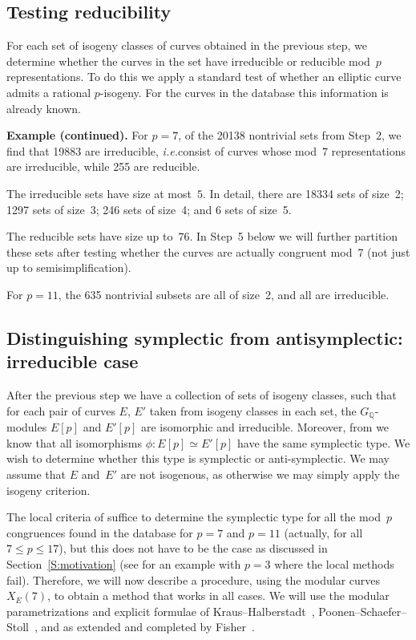 \documentclass[12pt]{amsart}
\newcommand{\Q}{\mathbb{Q}}
\numberwithin{equation}{section}
\theoremstyle{definition}
\theoremstyle{remark}
\begin{document}
\subsection{Testing reducibility}
For each set  of isogeny classes of curves
obtained in the previous step, we determine whether the curves in the
set have irreducible or reducible mod~$p$ representations.  To do
this we apply a standard test of whether an elliptic curve admits a
rational $p$-isogeny.  For the curves in the database this information
is already known.

{\bf Example (continued).} For $p=7$, of the 20138 nontrivial sets from Step~2, we
find that 19883 are irreducible, {\it i.e.}\@ consist of curves whose
mod~$7$ representations are irreducible, while 255 are reducible.

The irreducible sets have size at most~$5$.  In detail, there are
18334 sets of size~2; 1297 sets of size~3; 246 sets of size~4; and 6
sets of size~5.

The reducible sets have size up to~$76$.  In Step~5 below we will
further partition these sets after testing whether the curves are
actually congruent mod~7 (not just up to semisimplification).


For $p=11$, the 635 nontrivial subsets are all of size~2, and
all are irreducible.


\subsection{Distinguishing symplectic from antisymplectic: irreducible case}
After the previous step we have a collection of sets of isogeny
classes, such that for each pair of curves $E$, $E'$ taken from
isogeny classes in each set, the $G_{\Q}$-modules $E[p]$ and $E'[p]$
are isomorphic and irreducible. Moreover, from
\cite[Corollary~3]{FKSym} we know that all isomorphisms $\phi : E[p]
\simeq E'[p]$ have the same symplectic type. We wish to determine
whether this type is symplectic or anti-symplectic.  We may assume
that $E$ and~$E'$ are not isogenous, as otherwise we may simply apply
the isogeny criterion.

The local criteria of \cite{FKSym} suffice to determine the symplectic type for all the mod~$p$ congruences found in
the database for $p=7$ and $p=11$ (actually, for all $7 \leq p \leq 17$), but this does not have to be the case as discussed in Section~\ref{S:motivation} (see \cite[Proposition~16]{FKSym} for an example with $p=3$ where the local methods fail).
Therefore, we will now describe a procedure, using the modular curves~$X_E(7)$, to obtain a method that works in all cases. 
We will use the
modular parametrizations and explicit formulae of Kraus--Halberstadt~\cite{Halberstadt-Kraus-XE7}, Poonen--Schaefer--Stoll~\cite{PSS}, and as extended and completed by Fisher~\cite{Fisher}. 
\end{document}
